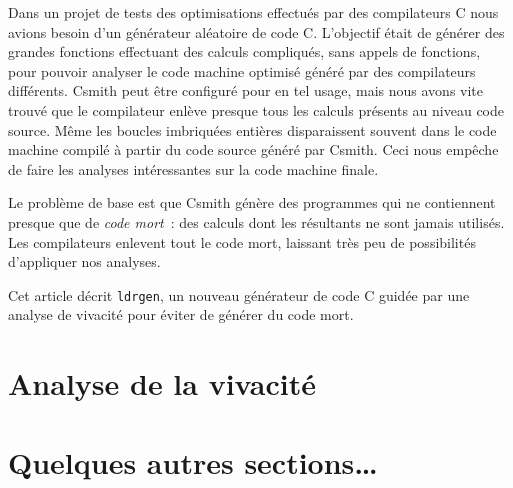 \documentclass[a4paper]{easychair}
\newcommand\ldrgen{\texttt{ldrgen}}
\begin{document}
Dans un projet de tests des optimisations effectués par des compilateurs C
nous avions besoin d'un générateur aléatoire de code C. L'objectif était de
générer des grandes fonctions effectuant des calculs compliqués, sans appels
de fonctions, pour pouvoir analyser le code machine optimisé généré par des
compilateurs différents. Csmith peut être configuré pour en tel usage, mais
nous avons vite trouvé que le compilateur enlève presque tous les calculs
présents au niveau code source. Même les boucles imbriquées entières
disparaissent souvent dans le code machine compilé à partir du code source
généré par Csmith. Ceci nous empêche de faire les analyses intéressantes sur
la code machine finale.

Le problème de base est que Csmith génère des programmes qui ne contiennent
presque que de \emph{code mort}~: des calculs dont les résultants ne sont
jamais utilisés. Les compilateurs enlevent tout le code mort, laissant très
peu de possibilités d'appliquer nos analyses.

Cet article décrit \ldrgen, un nouveau générateur de code C guidée par une
analyse de vivacité pour éviter de générer du code mort.


\section{Analyse de la vivacité}




\section{Quelques autres sections\dots}
\end{document}
